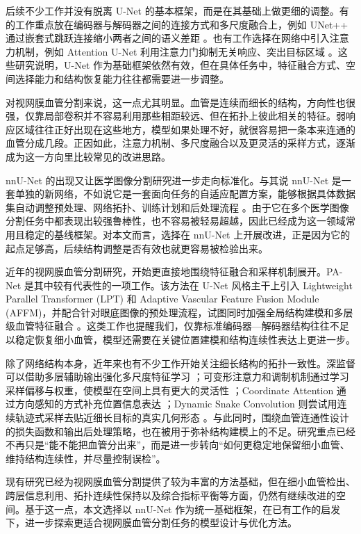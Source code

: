 \documentclass[a4paper,12pt]{article}
\begin{document}
后续不少工作并没有脱离 U-Net 的基本框架，而是在其基础上做更细的调整。有的工作重点放在编码器与解码器之间的连接方式和多尺度融合上，例如 UNet++ 通过嵌套式跳跃连接缩小两者之间的语义差距 \cite{zhou2018unetpp}。也有工作选择在网络中引入注意力机制，例如 Attention U-Net 利用注意力门抑制无关响应、突出目标区域 \cite{oktay2018attentionunet}。这些研究说明，U-Net 作为基础框架依然有效，但在具体任务中，特征融合方式、空间选择能力和结构恢复能力往往都需要进一步调整。

对视网膜血管分割来说，这一点尤其明显。血管是连续而细长的结构，方向性也很强，仅靠局部卷积并不容易利用那些相距较远、但在拓扑上彼此相关的特征。弱响应区域往往正好出现在这些地方，模型如果处理不好，就很容易把一条本来连通的血管分成几段。正因如此，注意力机制、多尺度融合以及更灵活的采样方式，逐渐成为这一方向里比较常见的改进思路。

nnU-Net 的出现又让医学图像分割研究进一步走向标准化。与其说 nnU-Net 是一套单独的新网络，不如说它是一套面向任务的自适应配置方案，能够根据具体数据集自动调整预处理、网络拓扑、训练计划和后处理流程 \cite{isensee2021nnunet}。由于它在多个医学图像分割任务中都表现出较强鲁棒性，也不容易被轻易超越，因此已经成为这一领域常用且稳定的基线框架。对本文而言，选择在 nnU-Net 上开展改进，正是因为它的起点足够高，后续结构调整是否有效也就更容易被检验出来。

近年的视网膜血管分割研究，开始更直接地围绕特征融合和采样机制展开。PA-Net 是其中较有代表性的一项工作。该方法在 U-Net 风格主干上引入 Lightweight Parallel Transformer (LPT) 和 Adaptive Vascular Feature Fusion Module (AFFM)，并配合针对眼底图像的预处理流程，试图同时加强全局结构建模和多层级血管特征融合 \cite{luo2025panet}。这类工作也提醒我们，仅靠标准编码器—解码器结构往往不足以稳定恢复细小血管，模型还需要在关键位置建模和结构连续性表达上更进一步。

除了网络结构本身，近年来也有不少工作开始关注细长结构的拓扑一致性。深监督可以借助多层辅助输出强化多尺度特征学习 \cite{lee2015dsn}；可变形注意力和调制机制通过学习采样偏移与权重，使模型在空间上具有更大的灵活性 \cite{zhu2021deformabledetr,zhu2019dcnv2}；Coordinate Attention 通过方向感知的方式补充位置信息表达 \cite{hou2021coordatt}；Dynamic Snake Convolution 则尝试用连续轨迹式采样去贴近细长目标的真实几何形态 \cite{qi2023dsc}。与此同时，围绕血管连通性设计的损失函数和输出后处理策略，也在被用于弥补结构建模上的不足。研究重点已经不再只是“能不能把血管分出来”，而是进一步转向“如何更稳定地保留细小血管、维持结构连续性，并尽量控制误检”。

现有研究已经为视网膜血管分割提供了较为丰富的方法基础，但在细小血管检出、跨层信息利用、拓扑连续性保持以及综合指标平衡等方面，仍然有继续改进的空间。基于这一点，本文选择以 nnU-Net 作为统一基础框架，在已有工作的启发下，进一步探索更适合视网膜血管分割任务的模型设计与优化方法。
\end{document}

